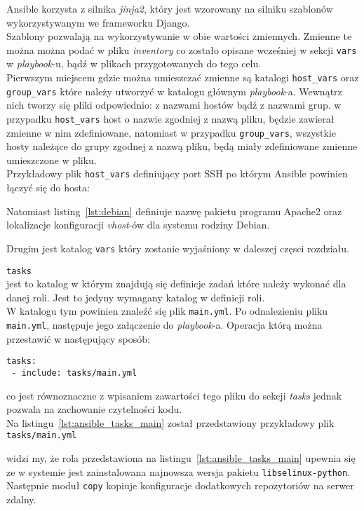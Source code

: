 \begin{description}
		Ansible korzysta z silnika \textit{jinja2}, który jest wzorowany na silniku szablonów wykorzystywanym we frameworku Django.\\
		Szablony pozwalają na wykorzystywanie w obie wartości zmiennych.
		Zmienne te można można podać w pliku \textit{inventory} co zostało opisane wcześniej w sekcji \texttt{vars} w \textit{playbook}-u, bądź w plikach przygotowanych do tego celu.\\
		Pierwszym miejscem gdzie można umieszczać zmienne są katalogi \texttt{host\_vars} oraz \texttt{group\_vars} które należy utworzyć w katalogu głównym \textit{playbook}-a.
		Wewnątrz nich tworzy się pliki odpowiednio: z nazwami hostów bądź z nazwami grup.
w przypadku \texttt{host\_vars} host o nazwie zgodniej z nazwą pliku, będzie zawierał zmienne w nim zdefiniowane, natomiast w przypadku \texttt{group\_vars}, wszystkie hosty należące do grupy zgodnej z nazwą pliku, będą miały zdefiniowane zmienne umieszczone w pliku.\\
		Przykładowy plik \texttt{host\_vars} definiujący port SSH po którym Ansible powinien łączyć się do hosta:
		
		Natomiast listing~\ref{lst:debian} definiuje nazwę pakietu programu Apache2 oraz lokalizacje konfiguracji \textit{vhost}-ów dla systemu rodziny Debian.
		
		Drugim jest katalog \texttt{vars} który zostanie wyjaśniony w daleszej częsci rozdziału.
	\item{\texttt{tasks}}\\
		jest to katalog w którym znajdują się definicje zadań które należy wykonać dla danej roli.
		Jest to jedyny wymagany katalog w definicji roli.\\
		W katalogu tym powinien znaleźć się plik \texttt{main.yml}.
		Po odnalezieniu pliku \texttt{main.yml}, następuje jego załączenie do \textit{playbook}-a.
		Operacja którą można przestawić w następujący sposób:
		\begin{lstlisting}
tasks:
 - include: tasks/main.yml
		\end{lstlisting}
		co jest równoznaczne z wpisaniem zawartości tego pliku do sekcji \textit{tasks} jednak pozwala na zachowanie czytelności kodu.\\
		Na listingu~\ref{lst:ansible_tasks_main} został przedstawiony przykładowy plik \texttt{tasks/main.yml}
		
						widzi  my, że rola przedstawiona na listingu~\ref{lst:ansible_tasks_main} upewnia się ze w systemie jest zainstalowana najnowsza wersja pakietu \texttt{libselinux-python}. Następnie moduł \texttt{copy} kopiuje konfiguracje dodatkowych repozytoriów na serwer zdalny.

\end{description}
